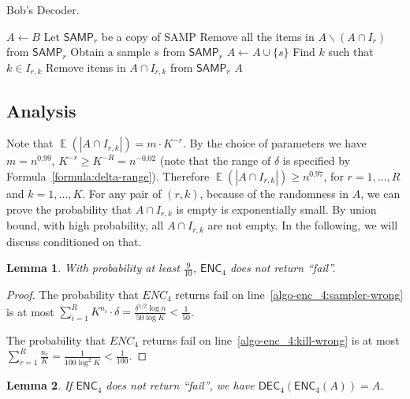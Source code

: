 \documentclass[10pt]{article}
\DeclareMathOperator*{\E}{\mathbb{E}}
\newtheorem{lemma}{Lemma}
\newcommand{\samp}{\textsf{SAMP}\xspace}
\newcommand{\enc}{\textsf{ENC}\xspace}
\newcommand{\dec}{\textsf{DEC}\xspace}
\begin{document}
\begin{algorithm}[H]
  \caption{Bob's Decoder.}
  \begin{algorithmic}[1]
    \Procedure{$\dec_4$}{\samp, $B$}
    \State $A\leftarrow B$
      \State Let $\samp_r$ be a copy of \samp 
      \State Remove all the items in $A\backslash (A\cap I_r)$ from $\samp_r$
      \State Obtain a sample $s$ from $\samp_r$
      \State $A\leftarrow A \cup \{s\}$
      \State Find $k$ such that $k\in I_{r,k}$
      \State Remove items in $A\cap I_{r,k}$ from $\samp_r$
      \EndFor
    \EndFor
    \State \Return $A$ 
    \EndProcedure
  \end{algorithmic}
\end{algorithm}

\subsection{Analysis} 

Note that $\E(|A\cap I_{r,k}|)=m\cdot K^{-r}$. By the choice of parameters we have $m=n^{0.99}$, $K^{-r}\ge K^{-R}=n^{-0.02}$ (note that the range of $\delta$ is specified by Formula~\ref{formula:delta-range}). Therefore $\E(|A\cap I_{r,k}|) \ge n^{0.97}$, for $r=1,\ldots, R$ and $k=1,\ldots, K$. For any pair of $(r,k)$, because of the randomness in $A$, we can prove the probability that $A\cap I_{r,k}$ is empty is exponentially small. By union bound, with high probability, all $A\cap I_{r,k}$ are not empty. In the following, we will discuss conditioned on that.

\begin{lemma} \label{lemma:enc_4-sampler-work}
  With probability at least $\frac{9}{10}$, $\enc_4$ does not return ``fail''. 
\end{lemma}

\begin{proof}
  The probability that $ENC_4$ returns fail on line~\ref{algo-enc_4:sampler-wrong} is at most $\sum_{i=1}^{R} K^{n_i}\cdot \delta = \frac{\delta^{1/2} \log n}{50\log K} < \frac{1}{50}$. 
  
  The probability that $ENC_4$ returns fail on line~\ref{algo-enc_4:kill-wrong} is at most $\sum_{r=1}^{R}{\frac{n_r}{K}}=\frac{1}{100\log^2 K}<\frac{1}{100}$.
  
\end{proof}

\begin{lemma}
  If $\enc_4$ does not return ``fail'', we have $\dec_4(\enc_4(A))=A$.
\end{lemma}
\end{document}
